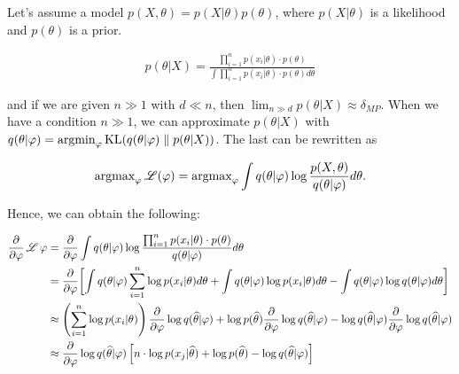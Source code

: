Let's assume a model $p(X, \theta) = p(X | \theta) p(\theta)$, where $p(X | \theta)$ is a likelihood and $p(\theta)$ is a prior. 

\begin{equation*}
    \begin{aligned}
        p(\theta | X) = \frac{\prod_{i = 1}^n p(x_i | \theta) \cdot p(\theta)}{\int \prod_{i = 1}^n p(x_i | \theta) \cdot p(\theta) d\theta} 
    \end{aligned}
\end{equation*}

and if we are given $n \gg 1$ with $d \ll n$, then $\lim_{n \gg d} p(\theta | X) \approx \delta_{MP}$. When we have a condition $n \gg 1$, we can approximate $p(\theta | X)$ with $q(\theta | \varphi) = \operatorname{argmin}_{\varphi} \operatorname{KL}(q(\theta | \varphi) \parallel p(\theta | X))$. The last can be rewritten as

\begin{equation*}
    \begin{aligned}
        \operatorname{argmax}_{\varphi} \operatorname{\mathscr{L}}(\varphi) = \operatorname{argmax}_{\varphi} \int q(\theta | \varphi) \log \frac{p(X, \theta)}{q(\theta | \varphi)} d\theta .
    \end{aligned}
\end{equation*}

Hence, we can obtain the following:

\begin{equation}
    \begin{aligned}
        \frac{\partial}{\partial \varphi} \operatorname{\mathscr{L}} \varphi &= \frac{\partial}{\partial \varphi} \int q(\theta | \varphi) \log \frac{\prod_{i = 1}^n p(x_i | \theta) \cdot p(\theta)}{q(\theta | \varphi)} d\theta \\ 
        &= \frac{\partial}{\partial \varphi} \biggl[ \int q(\theta | \varphi) \sum_{i = 1}^n \log p(x_i | \theta) d\theta +  \int q(\theta | \varphi) \log p(x_i | \theta) d \theta - \int q (\theta | \varphi) \log q(\theta | \varphi) d \theta \biggr] \\ 
        &\approx \left( \sum_{i = 1}^n \log p(x_i | \theta) \right) \frac{\partial}{\partial \varphi} \log q(\widehat{\theta} | \varphi) + \log p(\widehat{\theta}) \frac{\partial}{\partial \varphi} \log q(\widehat{\theta} | \varphi) - \log q(\widehat{\theta} | \varphi) \frac{\partial}{\partial \varphi} \log q(\widehat{\theta} | \varphi) \\ 
        &\approx \frac{\partial}{\partial \varphi} \log q(\widehat{\theta} | \varphi) \left[ n \cdot \log p(x_j | \widehat{\theta}) + \log p(\widehat{\theta}) - \log q(\widehat{\theta} | \varphi) \right] \\
    \end{aligned}
\end{equation}

